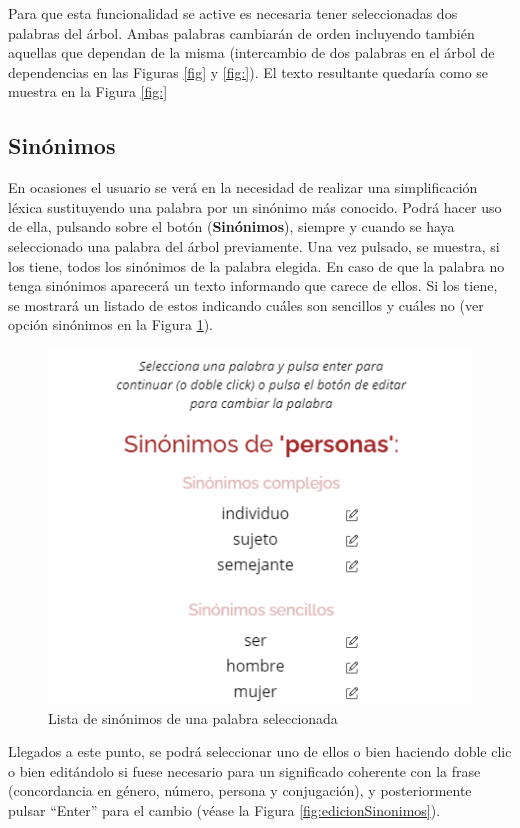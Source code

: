 Para que esta funcionalidad se active es necesaria tener seleccionadas dos palabras del árbol. Ambas palabras cambiarán de orden incluyendo también aquellas que dependan de la misma (intercambio de dos palabras en el árbol de dependencias en las Figuras \ref{fig} y \ref{fig:}). El texto resultante quedaría como se muestra en la Figura \ref{fig:}

\subsection{Sinónimos}
En ocasiones el usuario se verá en la necesidad de realizar una simplificación léxica sustituyendo una palabra por un sinónimo más conocido. Podrá hacer uso de ella, pulsando sobre el botón (\textbf{Sinónimos}), siempre y cuando se haya seleccionado una palabra del árbol previamente. Una vez pulsado, se muestra, si los tiene, todos los sinónimos de la palabra elegida. En caso de que la palabra no tenga sinónimos aparecerá un texto informando que carece de ellos. Si los tiene, se mostrará un listado de estos indicando cuáles son sencillos y cuáles no (ver opción sinónimos en la Figura \ref{fig:listaSinonimos}).

	 \begin{figure}[h!]
	\centering
	
	
	\includegraphics[scale=1.0]{Imagenes/Figuras/SinonimoPersona}
	
	
	\caption{Lista de sinónimos de una palabra seleccionada}
	\label{fig:listaSinonimos}
\end{figure}

 Llegados a este punto, se podrá seleccionar uno de ellos o bien haciendo doble clic o bien editándolo si fuese necesario para un significado coherente con la frase (concordancia en género, número, persona y conjugación), y posteriormente pulsar ``Enter'' para el cambio (véase la Figura \ref{fig:edicionSinonimos}).


